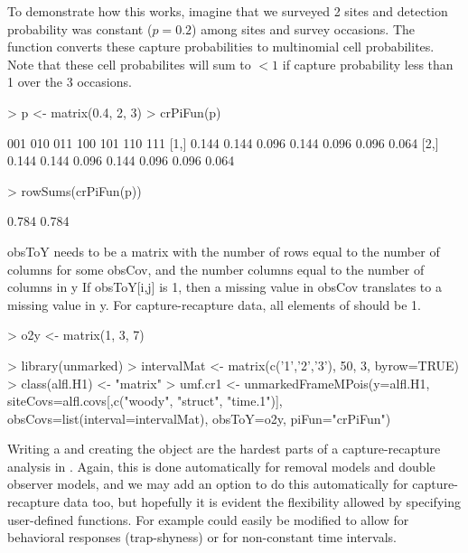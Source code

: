 \documentclass[a4paper]{article}
\renewenvironment{Schunk}{\vspace{\topsep}}{\vspace{\topsep}}
\begin{document}
To demonstrate how this works, imagine that we surveyed 2 sites and
detection probability was constant ($p=0.2$) among sites and survey
occasions. The function converts these capture probabilities to
multinomial cell probabilites. Note that these cell probabilites will
sum to $< 1$ if capture probability less than 1 over the 3 occasions.

\begin{Schunk}
\begin{Sinput}
> p <- matrix(0.4, 2, 3)
> crPiFun(p)
\end{Sinput}
\begin{Soutput}
       001   010   011   100   101   110   111
[1,] 0.144 0.144 0.096 0.144 0.096 0.096 0.064
[2,] 0.144 0.144 0.096 0.144 0.096 0.096 0.064
\end{Soutput}
\begin{Sinput}
> rowSums(crPiFun(p))
\end{Sinput}
\begin{Soutput}
[1] 0.784 0.784
\end{Soutput}
\end{Schunk}





obsToY needs to be a matrix with
the number of rows equal to the number of columns for some obsCov, and
the number columns equal to the number of columns in y
If obsToY[i,j] is 1, then a missing value in obsCov translates to
a missing value in y. For capture-recapture data, all elements of
 should be 1.

\begin{Schunk}
\begin{Sinput}
> o2y <- matrix(1, 3, 7)
\end{Sinput}
\end{Schunk}



\begin{Schunk}
\begin{Sinput}
> library(unmarked)
> intervalMat <- matrix(c('1','2','3'), 50, 3, byrow=TRUE)
> class(alfl.H1) <- "matrix"
> umf.cr1 <- unmarkedFrameMPois(y=alfl.H1,
                         siteCovs=alfl.covs[,c("woody", "struct", "time.1")],
                         obsCovs=list(interval=intervalMat),
                         obsToY=o2y, piFun="crPiFun")
\end{Sinput}
\end{Schunk}


Writing a  and creating the  object are
the hardest parts of a capture-recapture analysis in
. Again, this is done automatically for removal models
and double observer models, and we may add an option to do this
automatically for capture-recapture data too, but hopefully it is
evident the flexibility allowed by specifying user-defined
functions. For example  could easily be modified to
allow for behavioral responses (trap-shyness) or for non-constant time
intervals.
\end{document}
